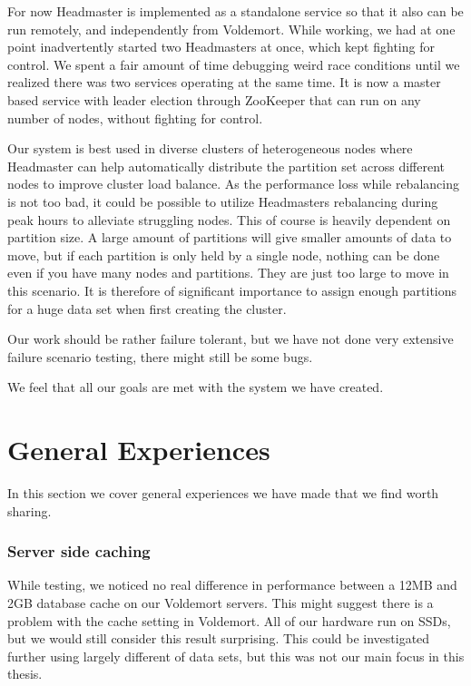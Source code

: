 For now Headmaster is implemented as a standalone service so that it also can be run remotely, and independently from Voldemort.
While working, we had at one point inadvertently started two Headmasters at once, which kept fighting for control.
We spent a fair amount of time debugging weird race conditions until we realized there was two services operating at the same time.
It is now a master based service with leader election through ZooKeeper that can run on any number of nodes, without fighting for control.

Our system is best used in diverse clusters of heterogeneous nodes where Headmaster can help automatically distribute the partition set across different nodes to improve cluster load balance. As the performance loss while rebalancing is not too bad, it could be possible to utilize Headmasters rebalancing during peak hours to alleviate struggling nodes. This of course is heavily dependent on partition size. A large amount of partitions will give smaller amounts of data to move, but if each partition is only held by a single node, nothing can be done even if you have many nodes and partitions. They are just too large to move in this scenario. It is therefore of significant importance to assign enough partitions for a huge data set when first creating the cluster.

Our work should be rather failure tolerant, but we have not done very extensive failure scenario testing, there might still be some bugs. 

We feel that all our goals are met with the system we have created.

\section{General Experiences}
In this section we cover general experiences we have made that we find worth sharing. 
\label{eval:exp}

\subsubsection{Server side caching}
While testing, we noticed no real difference in performance between a 12MB and 2GB database cache on our Voldemort servers. This might suggest there is a problem with the cache setting in Voldemort. All of our hardware run on SSDs, but we would still consider this result surprising. This could be investigated further using largely different of data sets, but this was not our main focus in this thesis.

